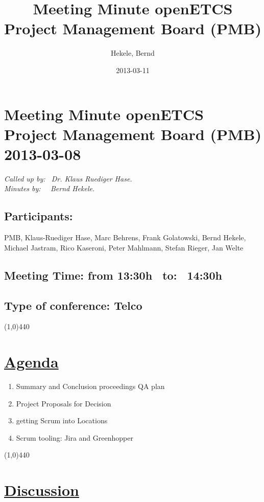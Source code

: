 \documentclass[a4paper]{article}
\title{Meeting Minute openETCS Project Management Board (PMB)}
\author{Hekele, Bernd}
\date{2013-03-11}
\begin{document}
\section*{\large{Meeting Minute openETCS Project Management Board (PMB) 2013-03-08}}

\emph{Called up by: \ Dr. Klaus Ruediger Hase.}\\
\emph{Minutes by: \ \  Bernd Hekele.}


\subsection*{Participants:} PMB, 
Klaus-Ruediger Hase, 
Marc Behrens, 
Frank Golatowski, 
Bernd Hekele,
Michael Jastram, 
Rico Kaseroni, 
Peter Mahlmann, 
Stefan Rieger, 
Jan Welte\\



\subsection*{Meeting Time: from 13:30h \ to: \ 14:30h}

\subsection*{Type of conference: Telco}

\line(1,0){440}
\section*{\underline{Agenda}}
\begin{enumerate}
\item Summary and Conclusion proceedings QA plan
\item Project Proposals for Decision
\item getting Scrum into Locations
\item Scrum tooling: Jira and Greenhopper
\end{enumerate}
\line(1,0){440}
\section*{\underline{Discussion}}
\end{document}
